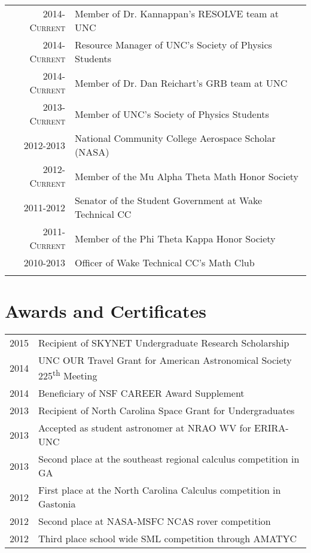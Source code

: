 \documentclass[a4paper,10pt]{article} %
\begin{document}
\begin{tabular}{rl}

2014-\textsc{Current} & Member of Dr. Kannappan's RESOLVE team at UNC\\
2014-\textsc{Current} & Resource Manager of UNC's Society of Physics Students\\
2014-\textsc{Current} & Member of Dr. Dan Reichart's GRB team at UNC\\
2013-\textsc{Current} & Member of UNC's Society of Physics Students\\
2012-2013 & National Community College Aerospace Scholar (NASA)\\
2012-\textsc{Current} & Member of the Mu Alpha Theta Math Honor Society\\
2011-2012 & Senator of the Student Government at Wake Technical CC\\
2011-\textsc{Current} & Member of the Phi Theta Kappa Honor Society\\
2010-2013 & Officer of Wake Technical CC's Math Club\\
&\\
\end{tabular}


\section{Awards and Certificates}

\begin{tabular}{rl}
2015 & Recipient of SKYNET Undergraduate Research Scholarship\\
2014 & UNC OUR Travel Grant for American Astronomical Society 225\textsuperscript{th} Meeting\\
2014 & Beneficiary of NSF CAREER Award Supplement\\
2013 & Recipient of North Carolina Space Grant for Undergraduates\\
2013 & Accepted as student astronomer at NRAO WV for ERIRA-UNC\\
2013 & Second place at the southeast regional calculus competition in GA\\
2012 & First place at the North Carolina Calculus competition in Gastonia \\
2012 & Second place at NASA-MSFC NCAS rover competition\\
2012 & Third place school wide SML competition through AMATYC\\

\end{tabular}
\end{document}
